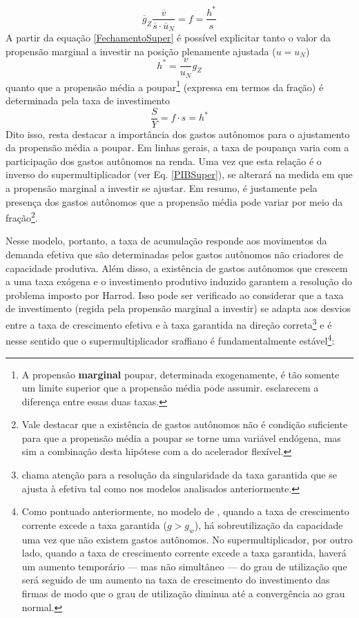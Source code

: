 \begin{equation}
\label{FechamentoSuper}
\overline g_Z\frac{\overline v}{\overline s\cdot \overline u_N} = f = \frac{h^*}{s}
\end{equation}
A partir da equação \ref{FechamentoSuper} é possível explicitar tanto o valor da propensão marginal a investir na posição plenamente ajustada ($u = u_N$)
$$
h^* = \frac{v}{u_N}g_Z
$$
quanto que a propensão média a poupar\footnote{A propensão \textbf{marginal} poupar, determinada exogenamente, é tão somente um limite superior que a propensão média pode assumir. \textcite[p.~51--52]{serrano_o_2000} esclarecem a diferença entre essas duas taxas.} (expressa em termos da fração) é determinada pela taxa de investimento 
$$
\frac{S}{Y} = f\cdot s = h^*
$$
Dito isso, resta destacar a importância dos gastos autônomos para o ajustamento da propensão média a poupar.
Em linhas gerais, a taxa de poupança varia com a participação dos gastos autônomos na renda.
Uma vez que esta relação é o inverso do supermultiplicador (ver Eq. \ref{PIBSuper}), se alterará na medida em que a propensão marginal a investir se ajustar.
Em resumo, é justamente pela presença dos gastos autônomos que a propensão média pode variar por meio da fração\footnote{
	Vale destacar que a existência de gastos autônomos não é condição suficiente para que a propensão média a poupar se torne uma variável endógena, mas sim a combinação desta hipótese com a do acelerador flexível.
}.

Nesse modelo, portanto, a taxa de acumulação responde aos movimentos da demanda efetiva que são determinadas pelos gastos autônomos não criadores de capacidade produtiva. Além disso, a existência de gastos autônomos que crescem a uma taxa exógena e o investimento produtivo induzido garantem a resolução do problema imposto por Harrod. Isso pode ser verificado ao considerar que a taxa de investimento (regida pela propensão marginal a investir) se adapta aos desvios entre a taxa de crescimento efetiva e à taxa garantida na direção correta\footnote{\textcite{cesaratto_neo-kaleckian_2015} chama atenção para a resolução da singularidade da taxa garantida que se ajusta à efetiva tal como nos modelos analisados anteriormente.} e é nesse sentido que o supermultiplicador sraffiano é fundamentalmente estável\footnote{
	Como pontuado anteriormente, no modelo de \textcite{harrod_essay_1939}, quando a taxa de crescimento corrente excede a taxa garantida ($g > g_w$), há sobreutilização da capacidade uma vez que não existem gastos autônomos. 
	No supermultiplicador, por outro lado, quando a taxa de crescimento corrente excede a taxa garantida, haverá 
	um aumento temporário --- mas não simultâneo --- do grau de utilização que será seguido de um aumento na taxa de crescimento do investimento das firmas de modo que o grau de utilização diminua até a convergência ao grau normal.}:

